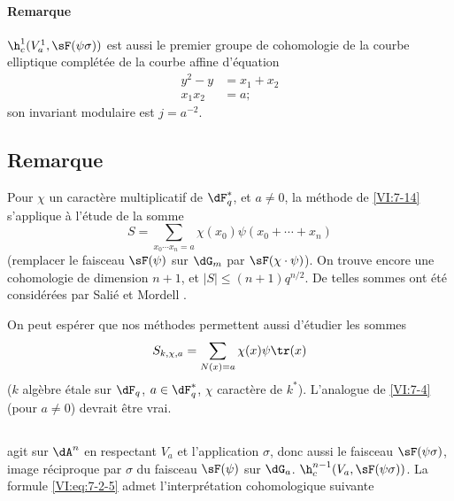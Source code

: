 \paragraph{Remarque}

$\h_c^1(V_a^1,\sF(\psi\sigma))$ est aussi le premier groupe de cohomologie de 
la courbe elliptique complétée de la courbe affine d'équation 
\begin{align*}
  y^2-y &= x_1+x_2 \\
  x_1 x_2 &= a \text{;} 
\end{align*}
son invariant modulaire est $j=a^{-2}$. 






\subsection{Remarque}\label{VI:7-18}

Pour $\chi$ un caractère multiplicatif de $\dF_q^\ast$, et $a\ne 0$, la 
méthode de \ref{VI:7-14} s'applique à l'étude de la somme 
\[
  S = \sum_{x_0\dotsm x_n = a} \chi(x_0) \psi(x_0+\cdots + x_n) 
\]
(remplacer le faisceau $\sF(\psi)$ sur $\dG_m$ par $\sF(\chi\cdot \psi)$). On 
trouve encore une cohomologie de dimension $n+1$, et 
$|S|\leqslant (n+1)q^{n/2}$. De telles sommes ont été considérées par 
Salié et Mordell .

On peut espérer que nos méthodes permettent aussi d'étudier les sommes 
\[
  S_{k,\chi,a} = \sum_{N(x)=a} \chi(x) \psi \tr(x) 
\]
($k$ algèbre étale sur $\dF_q$, $a\in \dF_q^\ast$, $\chi$ caractère de 
$k^\ast$). L'analogue de \ref{VI:7-4} (pour $a\ne 0$) devrait être vrai. 





\subsection{}\label{VI:7-19}

 agit sur $\dA^n$ en respectant $V_a$ et 
l'application $\sigma$, donc aussi le faisceau $\sF(\psi\sigma)$, image 
réciproque par $\sigma$ du faisceau $\sF(\psi)$ sur $\dG_a$.  $\h_c^{n-1}(V_a,\sF(\psi\sigma))$. La formule \eqref{VI:eq:7-2-5} admet 
l'interprétation cohomologique suivante





